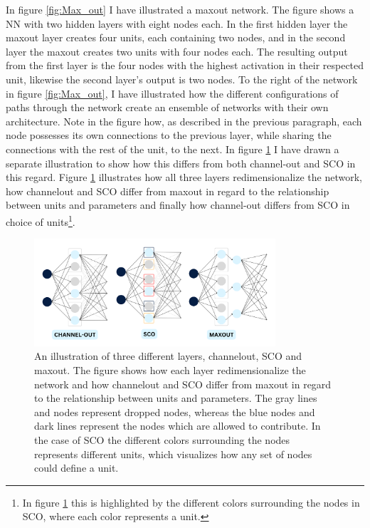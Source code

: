 In figure \ref{fig:Max_out} I have illustrated a maxout network. The figure shows a \ac{NN} with two hidden layers
with eight nodes each. In the first hidden layer the maxout layer creates four units, each containing two nodes, and in the 
second layer the maxout creates two units with four nodes each. The resulting output from the first layer is the 
four nodes with the highest activation in their respected unit, likewise the second layer's output is two nodes.
To the right of the network in figure \ref{fig:Max_out}, I have illustrated how the different configurations of 
paths through the network create an ensemble of networks with their own architecture. Note in the figure how, as described in the 
previous paragraph, each node possesses its own connections to the previous layer, while sharing the connections with the 
rest of the unit, to the next. In figure \ref{fig:NetEnsembleComp} I have drawn a separate illustration to show how 
this differs from both channel-out and \ac{SCO} in this regard. Figure \ref{fig:NetEnsembleComp} illustrates how 
all three layers redimensionalize the network, how channelout and \ac{SCO} differ from maxout in regard to the relationship 
between units and parameters and finally how channel-out differs from \ac{SCO} in choice of units\footnote{In figure 
\ref{fig:NetEnsembleComp} this is highlighted by the different colors surrounding the nodes in \ac{SCO}, where each color 
represents a unit.}.
\begin{figure}
    \centering
    \includegraphics[width=0.8\textwidth]{Figures/Illustrations/EnsembleComp.png}
    \caption[An illustration of three different layers, channelout, \acs{SCO} and maxout.]{An illustration of three different layers, channelout, 
    \ac{SCO} and maxout. The figure shows how each layer redimensionalize the network and how channelout and \ac{SCO} differ from maxout in regard 
    to the relationship between units and parameters. The gray lines and nodes represent dropped nodes, whereas the blue nodes and dark lines represent
    the nodes which are allowed to contribute. In the case of \ac{SCO} the different colors surrounding the nodes represents different units, which 
    visualizes how any set of nodes could define a unit.}
    \label{fig:NetEnsembleComp}
\end{figure}
